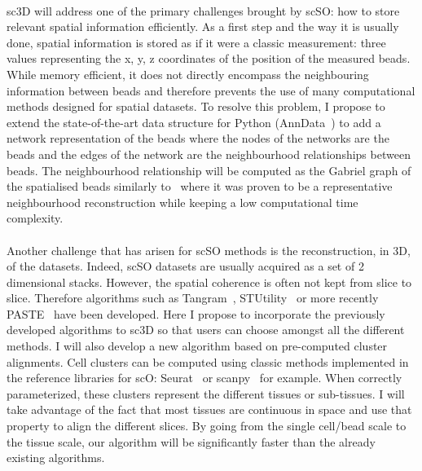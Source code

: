 \paragraph{}sc3D will address one of the primary challenges brought by scSO: how to store relevant spatial information efficiently.
As a first step and the way it is usually done, spatial information is stored as if it were a classic measurement: three values representing the x, y, z coordinates of the position of the measured beads.
While memory efficient, it does not directly encompass the neighbouring information between beads and therefore prevents the use of many computational methods designed for spatial datasets.
To resolve this problem, I propose to extend the state-of-the-art data structure for Python (AnnData~\cite{Wolf2018}) to add a network representation of the beads where the nodes of the networks are the beads and the edges of the network are the neighbourhood relationships between beads.
The neighbourhood relationship will be computed as the Gabriel graph of the spatialised beads similarly to~\cite{McDole:2018aa} where it was proven to be a representative neighbourhood reconstruction while keeping a low computational time complexity.
\paragraph{}Another challenge that has arisen for scSO methods is the reconstruction, in 3D, of the datasets.
Indeed, scSO datasets are usually acquired as a set of 2 dimensional stacks.
However, the spatial coherence is often not kept from slice to slice.
Therefore algorithms such as Tangram~\cite{Biancalani2021}, STUtility~\cite{Bergenstrahle2020} or more recently PASTE~\cite{Zeira2022} have been developed.
Here I propose to incorporate the previously developed algorithms to sc3D so that users can choose amongst all the different methods.
I will also develop a new algorithm based on pre-computed cluster alignments.
Cell clusters can be computed using classic methods implemented in the reference libraries for scO: Seurat~\cite{Hao2021} or scanpy~\cite{Wolf2018} for example.
When correctly parameterized, these clusters represent the different tissues or sub-tissues.
I will take advantage of the fact that most tissues are continuous in space and use that property to align the different slices.
By going from the single cell/bead scale to the tissue scale, our algorithm will be significantly faster than the already existing algorithms.
